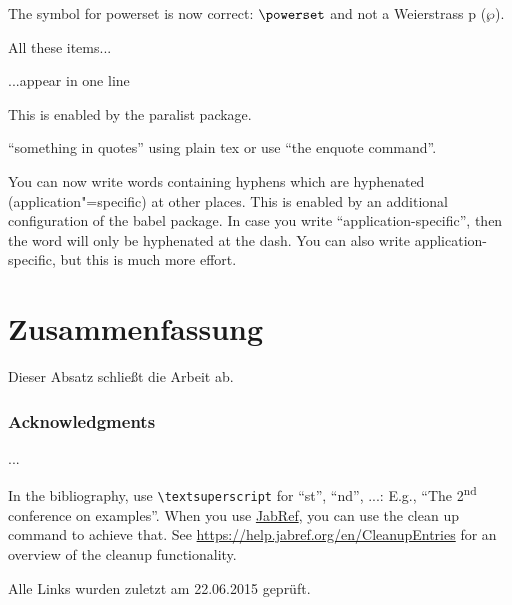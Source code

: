 \documentclass[runningheads,a4paper]{llncs}[2015/06/24]
\begin{document}
The symbol for powerset is now correct: $\powerset$ and not a Weierstrass p ($\wp$).

\begin{inparaenum}
\item All these items...
\item ...appear in one line
\item This is enabled by the paralist package.
\end{inparaenum}

``something in quotes'' using plain tex or use \enquote{the enquote command}.

You can now write words containing hyphens which are hyphenated (application"=specific) at other places.
This is enabled by an additional configuration of the babel package.
In case you write \enquote{application-specific}, then the word will only be hyphenated at the dash.
You can also write applica\allowbreak{}tion-specific, but this is much more effort.

\section{Zusammenfassung}
\label{sec:zusfas}
Dieser Absatz schließt die Arbeit ab.

\subsubsection*{Acknowledgments}
...

In the bibliography, use \texttt{\textbackslash textsuperscript} for ``st'', ``nd'', ...:
E.g., \enquote{The 2\textsuperscript{nd} conference on examples}.
When you use \href{https://www.jabref.org}{JabRef}, you can use the clean up command to achieve that.
See \url{https://help.jabref.org/en/CleanupEntries} for an overview of the cleanup functionality.




Alle Links wurden zuletzt am 22.06.2015 geprüft.
\end{document}
